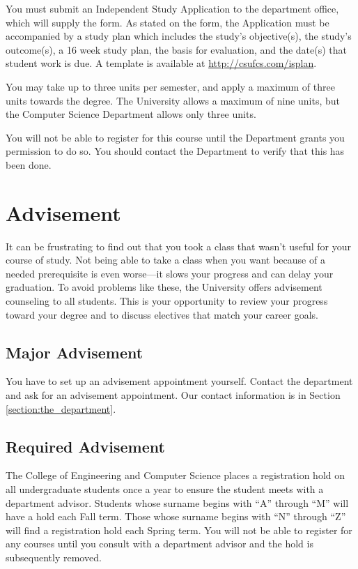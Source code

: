 \documentclass{book}
\newcommand{\shrunkurl}[1]{\url{http://csufcs.com/#1}}
\begin{document}
You must submit an Independent Study Application to the department office, which will supply the form. As stated on the form, the Application must be accompanied by a study plan which includes the study's objective(s), the study's outcome(s), a 16 week study plan, the basis for evaluation, and the date(s) that student work is due. A template is available at \shrunkurl{isplan}.

You may take up to three units per semester, and apply a maximum of three units towards the degree. The University allows a maximum of nine units, but the Computer Science Department allows only three units.

You will not be able to register for this course until the Department grants you permission to do so. You should contact the Department to verify that this has been done.

\chapter{Advisement}

It can be frustrating to find out that you took a class that wasn't useful for your course of study. Not being able to take a class when you want because of a needed prerequisite is even worse---it slows your progress and can delay your graduation. To avoid problems like these, the University offers advisement counseling to all students. This is your opportunity to review your progress toward your degree and to discuss electives that match your career goals.

\section{Major Advisement}
You have to set up an advisement appointment yourself. Contact the department and ask for an advisement appointment. Our contact information is in Section \ref{section:the_department}.

\section{Required Advisement}
The College of Engineering and Computer Science places a registration hold on
all undergraduate students once a year to ensure the student meets with a
department advisor. Students whose surname begins with ``A'' through ``M'' will
have a hold each Fall term. Those whose surname begins with ``N'' through
``Z'' will find a registration hold each Spring term.  You will not be able to
register for any courses until you consult with a department advisor and the
hold is subsequently removed.
\end{document}
